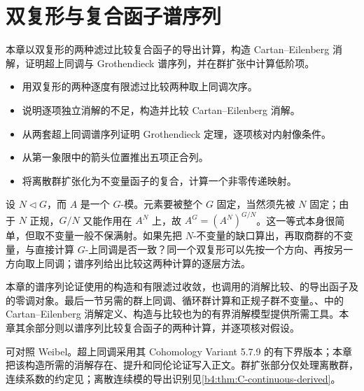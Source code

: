 
\chapter{双复形与复合函子谱序列}
\label{b4:ch:15}

\begin{chapterabstract}
	本章以双复形的两种滤过比较复合函子的导出计算，构造 Cartan--Eilenberg 消解，证明超上同调与 Grothendieck 谱序列，并在群扩张中计算低阶项。
\end{chapterabstract}

\begin{learninggoals}
	\begin{itemize}
		\item 用双复形的两种逐度有限滤过比较两种取上同调次序。
		\item 说明逐项独立消解的不足，构造并比较 Cartan--Eilenberg 消解。
		\item 从两套超上同调谱序列证明 Grothendieck 定理，逐项核对内射像条件。
		\item 从第一象限中的箭头位置推出五项正合列。
		\item 将离散群扩张化为不变量函子的复合，计算一个非零传递映射。
	\end{itemize}
\end{learninggoals}

设 \(N\triangleleft G\)，而 \(A\) 是一个 \(G\)-模。元素要被整个 \(G\) 固定，当然须先被 \(N\) 固定；由于 \(N\) 正规，\(G/N\) 又能作用在 \(A^N\) 上，故 \(A^G=(A^N)^{G/N}\)。这一等式本身很简单，但取不变量一般不保满射。如果先把 \(N\)-不变量的缺口算出，再取商群的不变量，与直接计算 \(G\)-上同调是否一致？同一个双复形可以先按一个方向、再按另一方向取上同调；谱序列给出比较这两种计算的逐层方法。

\ProseParagraphBreak
本章的谱序列论证使用的构造和有限滤过收敛，也调用的消解比较、的导出函子及的零调对象。最后一节另需的群上同调、循环群计算和正规子群不变量。、中的 Cartan--Eilenberg 消解定义、构造与比较也为的有界消解模型提供所需工具。本章其余部分则以谱序列比较复合函子的两种计算，并逐项核对假设。

\ProseParagraphBreak
可对照 Weibel\cite[Sections 5.6--5.8; Section 6.8]{Weibel1994HomologicalAlgebra}。超上同调采用其 Cohomology Variant 5.7.9 的有下界版本；本章把该构造所需的消解存在、提升和同伦论证写入正文。群扩张部分仅处理离散群，连续系数的约定见；离散连续模的导出识别见\cref{b4:thm:C-continuous-derived}。

